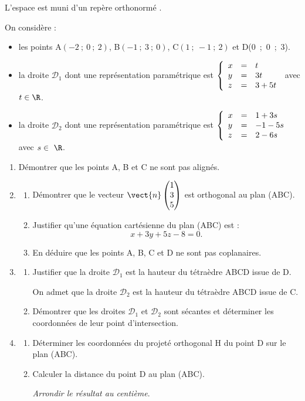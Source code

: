\medskip

L'espace est muni d'un repère orthonormé \Oijk.

On considère :

\begin{itemize}[label=$\bullet~$]
\item les points A$(-2~;~0~;~2)$,\: B$(-1~;~3~;~0)$,\: C$(1~;~-1~;~2)$ et D(0~;~0~;~3).
\item la droite $\mathcal{D}_1$ dont une représentation paramétrique est $\left\{\begin{array}{l c l}
x&=&t\\
y &=& 3t\\
z &=& 3 + 5t
\end{array}\right.$ avec $t \in \R$.
\item la droite $\mathcal{D}_2$ dont une représentation paramétrique est $\left\{\begin{array}{l c l}
x&=&1 + 3s\\ y &=& -1 - 5s\\z &=& 2 - 6s
\end{array}\right.$ avec $s \in~\R$.
\end{itemize}

\medskip

\begin{enumerate}
\item Démontrer que les points A, B et C ne sont pas alignés.
\item 
	\begin{enumerate}
		\item Démontrer que le vecteur $\vect{n}\begin{pmatrix}1\\3\\5\end{pmatrix}$ est orthogonal au plan (ABC).
		\item  Justifier qu'une équation cartésienne du plan (ABC) est :
\[x + 3y + 5z - 8 = 0.\]

		\item En déduire que les points A, B, C et D ne sont pas coplanaires.
	\end{enumerate}
\item 
	\begin{enumerate}
		\item Justifier que la droite $\mathcal{D}_1$ est la hauteur du tétraèdre ABCD issue de D.

On admet que la droite $\mathcal{D}_2$ est la hauteur du tétraèdre ABCD issue de C.
		\item Démontrer que les droites $\mathcal{D}_1$ et $\mathcal{D}_2$ sont sécantes et déterminer les coordonnées de leur point d'intersection.
	\end{enumerate}
\item 
	\begin{enumerate}
		\item Déterminer les coordonnées du projeté orthogonal H du point D sur le plan (ABC). 
		\item Calculer la distance du point D au plan (ABC). 

\emph{Arrondir le résultat au centième}.
	\end{enumerate}
\end{enumerate}
